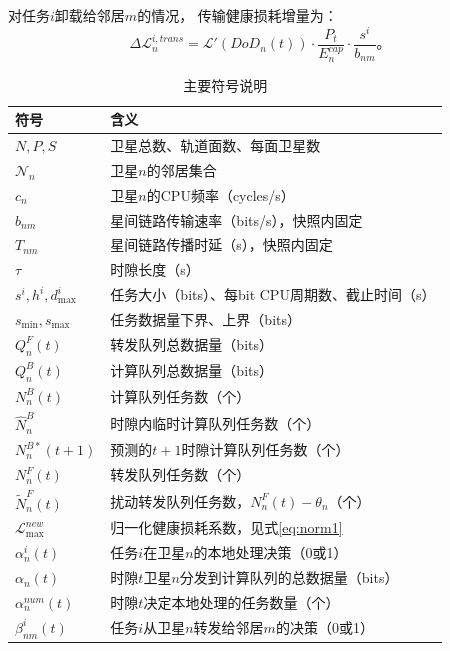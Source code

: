\documentclass[a4paper,11pt]{article}
\begin{document}
对任务$i$卸载给邻居$m$的情况，
传输健康损耗增量为：
\begin{equation}
    \Delta\mathcal{L}^{i,trans}_n =
    \mathcal{L}'(DoD_n(t)) \cdot
    \frac{P_t}{E^{cap}_n} \cdot
    \frac{s^i}{b_{nm}}。
    \label{eq:delta_L_trans}
\end{equation}

\begin{table}[t]
\centering
\caption{主要符号说明}
\label{tab:notation}
\begin{tabular}{ll}
\toprule
\textbf{符号} & \textbf{含义} \\
\midrule
$N, P, S$ & 卫星总数、轨道面数、每面卫星数 \\
$\mathcal{N}_n$ & 卫星$n$的邻居集合 \\
$c_n$ & 卫星$n$的CPU频率（cycles/s） \\
$b_{nm}$ & 星间链路传输速率（bits/s），快照内固定 \\
$T_{nm}$ & 星间链路传播时延（s），快照内固定 \\
$\tau$ & 时隙长度（s） \\
$s^i, h^i, d^i_{\max}$ & 任务大小（bits）、每bit CPU周期数、截止时间（s） \\
$s_{\min}, s_{\max}$ & 任务数据量下界、上界（bits） \\
$Q^F_n(t)$ & 转发队列总数据量（bits） \\
$Q^B_n(t)$ & 计算队列总数据量（bits） \\
$N^B_n(t)$ & 计算队列任务数（个） \\
$\hat{N}^B_n$ & 时隙内临时计算队列任务数（个） \\
$N^{B*}_n(t+1)$ & 预测的$t+1$时隙计算队列任务数（个） \\
$N^F_n(t)$ & 转发队列任务数（个） \\
$\tilde{N}^F_n(t)$ & 扰动转发队列任务数，$N^F_n(t) - \theta_n$（个） \\
$\mathcal{L}^{new}_{\max}$ & 归一化健康损耗系数，见式\eqref{eq:norm1} \\
$\alpha^i_n(t)$ & 任务$i$在卫星$n$的本地处理决策（0或1） \\
$\alpha_n(t)$ & 时隙$t$卫星$n$分发到计算队列的总数据量（bits） \\
$\alpha^{num}_n(t)$ & 时隙$t$决定本地处理的任务数量（个） \\
$\beta^i_{nm}(t)$ & 任务$i$从卫星$n$转发给邻居$m$的决策（0或1） \\

\end{tabular}
\end{table}
\end{document}
